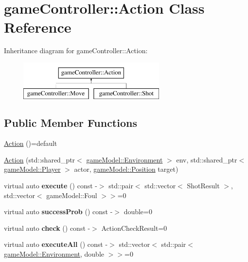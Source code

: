 \hypertarget{classgame_controller_1_1_action}{\section{game\-Controller\-:\-:Action Class Reference}
\label{classgame_controller_1_1_action}
}
Inheritance diagram for game\-Controller\-:\-:Action\-:\begin{figure}[H]
\begin{center}
\leavevmode
\includegraphics[height=2.000000cm]{classgame_controller_1_1_action}
\end{center}
\end{figure}
\subsection*{Public Member Functions}
\begin{DoxyCompactItemize}
\item 
\hyperlink{classgame_controller_1_1_action_a2bd3423680c850dcb88aa860a84cddee}{Action} ()=default
\item 
\hyperlink{classgame_controller_1_1_action_a74a9ef91e17f72be6d8f521931f24437}{Action} (std\-::shared\-\_\-ptr$<$ \hyperlink{classgame_model_1_1_environment}{game\-Model\-::\-Environment} $>$ env, std\-::shared\-\_\-ptr$<$ \hyperlink{classgame_model_1_1_player}{game\-Model\-::\-Player} $>$ actor, \hyperlink{structgame_model_1_1_position}{game\-Model\-::\-Position} target)
\item 
\hypertarget{classgame_controller_1_1_action_a7243ec6fcf8a36506d1a35a4abe333ec}{virtual auto {\bfseries execute} () const -\/$>$ std\-::pair$<$ std\-::vector$<$ Shot\-Result $>$, std\-::vector$<$ game\-Model\-::\-Foul $>$$>$=0}\label{classgame_controller_1_1_action_a7243ec6fcf8a36506d1a35a4abe333ec}

\item 
\hypertarget{classgame_controller_1_1_action_a9d9a301180bd5cd54a12ec912daf35c1}{virtual auto {\bfseries success\-Prob} () const -\/$>$ double=0}\label{classgame_controller_1_1_action_a9d9a301180bd5cd54a12ec912daf35c1}

\item 
\hypertarget{classgame_controller_1_1_action_abd249c0f371aac9d98a4fa60c4fd94c1}{virtual auto {\bfseries check} () const -\/$>$ Action\-Check\-Result=0}\label{classgame_controller_1_1_action_abd249c0f371aac9d98a4fa60c4fd94c1}

\item 
\hypertarget{classgame_controller_1_1_action_acb7adedb0d67ce14e3d825567dbc8585}{virtual auto {\bfseries execute\-All} () const -\/$>$ std\-::vector$<$ std\-::pair$<$ \hyperlink{classgame_model_1_1_environment}{game\-Model\-::\-Environment}, double $>$$>$=0}\label{classgame_controller_1_1_action_acb7adedb0d67ce14e3d825567dbc8585}

\end{DoxyCompactItemize}
